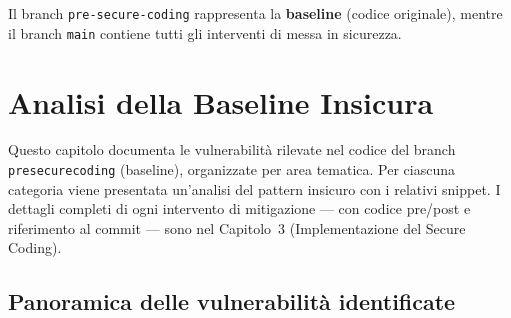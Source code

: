 ﻿\documentclass[a4paper,12pt]{report}
\begin{document}
Il branch \texttt{pre-secure-coding} rappresenta la \textbf{baseline} (codice originale), mentre il branch
\texttt{main} contiene tutti gli interventi di messa in sicurezza.

\chapter{Analisi della Baseline Insicura}

Questo capitolo documenta le vulnerabilità rilevate nel codice del branch \texttt{pre\-secure\-coding}
(baseline), organizzate per area tematica. Per ciascuna categoria viene presentata
un'analisi del pattern insicuro con i relativi snippet. I dettagli completi di ogni
intervento di mitigazione --- con codice pre/post e riferimento al commit ---
sono nel Capitolo~3 (Implementazione del Secure Coding).

\section{Panoramica delle vulnerabilità identificate}
\end{document}
